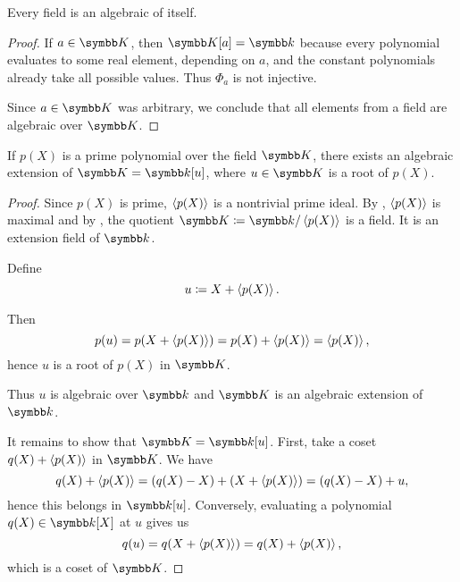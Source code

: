 \begin{proposition}\label{thm:field_elements_are_algebraic}
  Every field is an algebraic of itself.
\end{proposition}
\begin{proof}
  If \( a \in \BK \), then \( \BK[a] = \Bk \) because every polynomial evaluates to some real element, depending on \( a \), and the constant polynomials already take all possible values. Thus \( \Phi_a \) is not injective.

  Since \( a \in \BK \) was arbitrary, we conclude that all elements from a field are algebraic over \( \BK \).
\end{proof}

\begin{theorem}\label{thm:algebraic_extension_always_exists}\cite[485]{Knapp2016BAlg}
  If \( p(X) \) is a prime polynomial over the field \( \BK \), there exists an algebraic extension of \( \BK = \Bk[u] \), where \( u \in \BK \) is a root of \( p(X) \).
\end{theorem}
\begin{proof}
  Since \( p(X) \) is prime, \( \left\langle p(X) \right\rangle \) is a nontrivial prime ideal. By , \( \left\langle p(X) \right\rangle \) is maximal and by , the quotient \( \BK \coloneqq \Bk / \Gen{p(X)} \) is a field. It is an extension field of \( \Bk \).

  Define
  \begin{equation*}
    u \coloneqq X + \left\langle p(X) \right\rangle.
  \end{equation*}

  Then
  \begin{equation*}
    p(u) = p(X + \left\langle p(X) \right\rangle) = p(X) + \left\langle p(X) \right\rangle = \left\langle p(X) \right\rangle,
  \end{equation*}
  hence \( u \) is a root of \( p(X) \) in \( \BK \).

  Thus \( u \) is algebraic over \( \Bk \) and \( \BK \) is an algebraic extension of \( \Bk \).

  It remains to show that \( \BK = \Bk[u] \). First, take a coset \( q(X) + \left\langle p(X) \right\rangle \) in \( \BK \). We have
  \begin{equation*}
    q(X) + \left\langle p(X) \right\rangle = (q(X) - X) + (X + \left\langle p(X) \right\rangle) = (q(X) - X) + u,
  \end{equation*}
  hence this belongs in \( \Bk[u] \). Conversely, evaluating a polynomial \( q(X) \in \Bk[X] \) at \( u \) gives us
  \begin{equation*}
    q(u) = q(X + \left\langle p(X) \right\rangle) = q(X) + \left\langle p(X) \right\rangle,
  \end{equation*}
  which is a coset of \( \BK \).
\end{proof}

